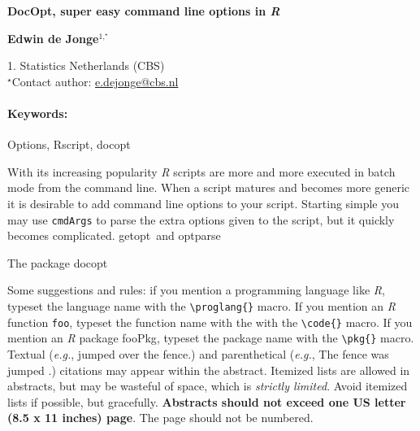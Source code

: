\documentclass[11pt, a4paper]{article}
\newcommand{\pkg}[1]{{\normalfont\fontseries{b}\selectfont #1}}
\let\proglang=\textit
\let\code=\texttt
\renewcommand{\title}[1]{\begin{center}{\bf \LARGE #1}\end{center}}
\newcommand{\keywords}{\paragraph{Keywords:}}
\begin{document}
\pagestyle{empty}

\title{DocOpt, super easy command line options in \proglang{R}}

\begin{center}
  {\bf Edwin de Jonge$^{1,^\star}$}
\end{center}

\begin{affiliations}
1. Statistics Netherlands (CBS) \\[-2pt]
$^\star$Contact author: \href{mailto:e.dejonge@cbs.nl}{e.dejonge@cbs.nl}\\
\end{affiliations}

\keywords Options, Rscript, docopt

\vskip 0.8cm

With its increasing popularity \proglang{R} scripts are more and more executed in batch mode from the command line. 
When a script matures and becomes more generic it is desirable to add command line options to your script.
Starting simple you may use \code{cmdArgs} to parse the extra options given to the script, but it quickly becomes complicated. \pkg{getopt}~\ci and \pkg{optparse}

The package \pkg{docopt}

Some suggestions and rules: if you mention a programming language like \proglang{R}, typeset the language name with the {\tt \textbackslash proglang\{\}} macro. If you mention an \proglang{R} function \code{foo}, typeset the function name with the with the {\tt\textbackslash code\{\}} macro. If you mention an \proglang{R} package \pkg{fooPkg}, typeset the package name with the {\tt\textbackslash pkg\{\}} macro. Textual ({\it e.g.}, \citet{ref1} jumped over the fence.) and parenthetical ({\it e.g.}, The fence was jumped \citep{ref1}.) citations may appear within the abstract. Itemized lists are allowed in abstracts, but may be wasteful of space, which is {\it strictly limited}. Avoid itemized lists if possible, but gracefully. {\bf Abstracts should not exceed one US letter (8.5 x 11 inches) page}. The page should not be numbered. 



\nocite{docopt,van2007python}






\end{document}
